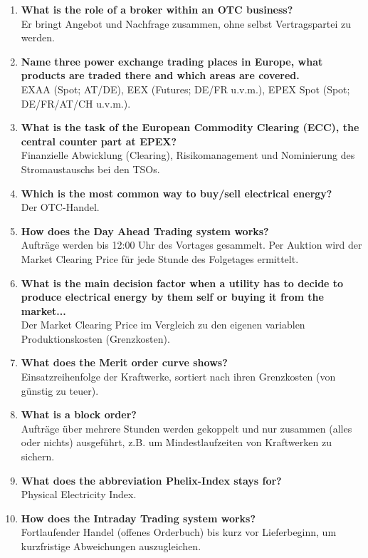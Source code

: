 \documentclass{article}
\begin{document}
\begin{enumerate}
    Over-the-counter. Direkter bilateraler Handel außerhalb der Strombörse.
    \item \textbf{What is the role of a broker within an OTC business?} \\
    Er bringt Angebot und Nachfrage zusammen, ohne selbst Vertragspartei zu werden.
    \item \textbf{Name three power exchange trading places in Europe, what products are traded there and which areas are covered.} \\
    EXAA (Spot; AT/DE), EEX (Futures; DE/FR u.v.m.), EPEX Spot (Spot; DE/FR/AT/CH u.v.m.).
    \item \textbf{What is the task of the European Commodity Clearing (ECC), the central counter part at EPEX?} \\
    Finanzielle Abwicklung (Clearing), Risikomanagement und Nominierung des Stromaustauschs bei den TSOs.
    \item \textbf{Which is the most common way to buy/sell electrical energy?} \\
    Der OTC-Handel.
    \item \textbf{How does the Day Ahead Trading system works?} \\
    Aufträge werden bis 12:00 Uhr des Vortages gesammelt. Per Auktion wird der Market Clearing Price für jede Stunde des Folgetages ermittelt.
    \item \textbf{What is the main decision factor when a utility has to decide to produce electrical energy by them self or buying it from the market...} \\
    Der Market Clearing Price im Vergleich zu den eigenen variablen Produktionskosten (Grenzkosten).
    \item \textbf{What does the Merit order curve shows?} \\
    Einsatzreihenfolge der Kraftwerke, sortiert nach ihren Grenzkosten (von günstig zu teuer).
    \item \textbf{What is a block order?} \\
    Aufträge über mehrere Stunden werden gekoppelt und nur zusammen (alles oder nichts) ausgeführt, z.B. um Mindestlaufzeiten von Kraftwerken zu sichern.
    \item \textbf{What does the abbreviation Phelix-Index stays for?} \\
    Physical Electricity Index.
    \item \textbf{How does the Intraday Trading system works?} \\
    Fortlaufender Handel (offenes Orderbuch) bis kurz vor Lieferbeginn, um kurzfristige Abweichungen auszugleichen.

\end{enumerate}
\end{document}
